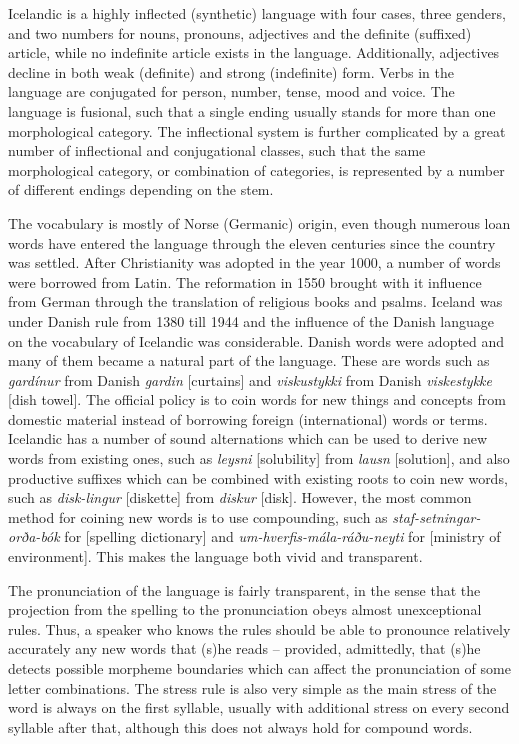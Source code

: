 \documentclass{../../metanetpaper}
\begin{document}
\begin{multicols}{2}
Icelandic is a highly inflected (synthetic) language with four cases, three genders, and two numbers for nouns, pronouns, adjectives and the definite (suffixed) article, while no indefinite article exists in the language. Additionally, adjectives decline in both weak (definite) and strong (indefinite) form. Verbs in the language are conjugated for person, number, tense, mood and voice. The language is fusional, such that a single ending usually stands for more than one morphological category. The inflectional system is further complicated by a great number of inflectional and conjugational classes, such that the same morphological category, or combination of categories, is represented by a number of different endings depending on the stem.

The vocabulary is mostly of Norse (Germanic) origin, even though numerous loan words have entered the language through the eleven centuries since the country was settled. After Christianity was adopted in the year 1000, a number of words were borrowed from Latin. The reformation in 1550 brought with it influence from German through the translation of religious books and psalms. Iceland was under Danish rule from 1380 till 1944 and the influence of the Danish language on the vocabulary of Icelandic was considerable. Danish words were adopted and many of them became a natural part of the language. These are words such as \textit{gardínur} from Danish \textit{gardin} {[}curtains{]} and \textit{viskustykki} from Danish \textit{viskestykke} {[}dish towel{]}.
The official policy is to coin words for new things and concepts from domestic material instead of borrowing foreign (international) words or terms. Icelandic has a number of sound alternations which can be used to derive new words from existing ones, such as \textit{leysni} {[}solubility{]} from \textit{lausn} {[}solution{]}, and also productive suffixes which can be combined with existing roots to coin new words, such as \textit{disk-lingur} {[}diskette{]} from \textit{diskur} {[}disk{]}. However, the most common method for coining new words is to use compounding, such as \textit{staf-setningar-orða-bók} for {[}spelling dictionary{]} and \textit{um-hverfis-mála-ráðu-neyti} for {[}ministry of environment{]}. This makes the language both vivid and transparent.

The pronunciation of the language is fairly transparent, in the sense that the projection from the spelling to the pronunciation obeys almost unexceptional rules. Thus, a speaker who knows the rules should be able to pronounce relatively accurately any new words that (s)he reads -- provided, admittedly, that (s)he detects possible morpheme boundaries which can affect the pronunciation of some letter combinations. The stress rule is also very simple as the main stress of the word is always on the first syllable, usually with additional stress on every second syllable after that, although this does not always hold for compound words. 


\end{multicols}
\end{document}
